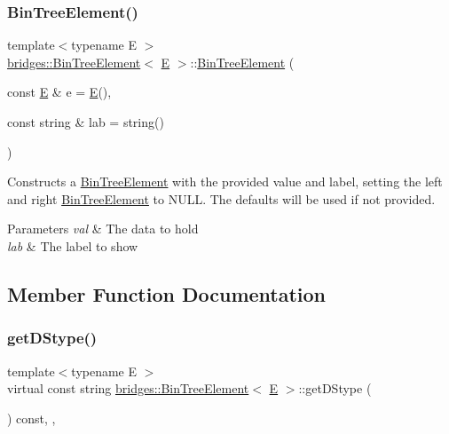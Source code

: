 \subsubsection{\texorpdfstring{BinTreeElement()}{BinTreeElement()}\hspace{0.1cm}{\footnotesize\ttfamily [2/2]}}
{\footnotesize\ttfamily template$<$typename E $>$ \\
\mbox{\hyperlink{classbridges_1_1_bin_tree_element}{bridges\+::\+Bin\+Tree\+Element}}$<$ \mbox{\hyperlink{namespacebridges_acfb0a4f7877d8f63de3e6862004c50eda3a3ea00cfc35332cedf6e5e9a32e94da}{E}} $>$\+::\mbox{\hyperlink{classbridges_1_1_bin_tree_element}{Bin\+Tree\+Element}} (\begin{DoxyParamCaption}\item[{const \mbox{\hyperlink{namespacebridges_acfb0a4f7877d8f63de3e6862004c50eda3a3ea00cfc35332cedf6e5e9a32e94da}{E}} \&}]{e = {\ttfamily \mbox{\hyperlink{namespacebridges_acfb0a4f7877d8f63de3e6862004c50eda3a3ea00cfc35332cedf6e5e9a32e94da}{E}}()},  }\item[{const string \&}]{lab = {\ttfamily string()} }\end{DoxyParamCaption})\hspace{0.3cm}{\ttfamily [inline]}}

Constructs a \mbox{\hyperlink{classbridges_1_1_bin_tree_element}{Bin\+Tree\+Element}} with the provided value and label, setting the left and right \mbox{\hyperlink{classbridges_1_1_bin_tree_element}{Bin\+Tree\+Element}} to N\+U\+LL. The defaults will be used if not provided.


\begin{DoxyParams}{Parameters}
{\em val} & The data to hold \\
\hline
{\em lab} & The label to show \\
\hline
\end{DoxyParams}


\subsection{Member Function Documentation}
\mbox{\label{classbridges_1_1_bin_tree_element_a0a154f68ef0a58715e598a6ef92b9e59}} 
\subsubsection{\texorpdfstring{getDStype()}{getDStype()}}
{\footnotesize\ttfamily template$<$typename E $>$ \\
virtual const string \mbox{\hyperlink{classbridges_1_1_bin_tree_element}{bridges\+::\+Bin\+Tree\+Element}}$<$ \mbox{\hyperlink{namespacebridges_acfb0a4f7877d8f63de3e6862004c50eda3a3ea00cfc35332cedf6e5e9a32e94da}{E}} $>$\+::get\+D\+Stype (\begin{DoxyParamCaption}{ }\end{DoxyParamCaption}) const\hspace{0.3cm}{\ttfamily [inline]}, {\ttfamily [override]}, {\ttfamily [virtual]}}

